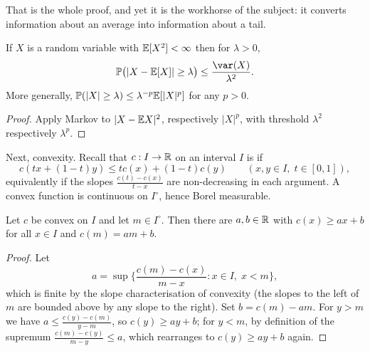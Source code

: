 \documentclass[a4paper]{scrartcl}
\begin{document}
That is the whole proof, and yet it is the workhorse of the subject: it converts information about an average into information about a tail.

\begin{corollary}
	If $X$ is a random variable with $\mathbb{E}[X^2] < \infty$ then for $\lambda>0$,
	$$
	\PP\big( |X - \EE[X]| \geq \lambda\big) \leq \frac{\var(X)}{\lambda^2}.
	$$
	More generally, $\mathbb{P}(|X| \geq \lambda) \leq \lambda^{-p}\mathbb{E}[|X|^p]$ for any $p > 0$.
\end{corollary}
\begin{proof}
	Apply Markov to $|X - \mathbb{E} X|^2$, respectively $|X|^p$, with threshold $\lambda^2$ respectively $\lambda^p$.
\end{proof}

Next, convexity. Recall that $c : I \to \mathbb{R}$ on an interval $I$ is  if
$$
c(tx + (1-t)y) \leq tc(x)+(1-t)c(y) \qquad (x,y \in I,\; t\in[0,1]),
$$
equivalently if the slopes $\frac{c(t)-c(x)}{t-x}$ are non-decreasing in each argument. A convex function is continuous on $I^\circ$, hence Borel measurable.

\begin{lemma}\label{lem:support}
	Let $c$ be convex on $I$ and let $m \in I^\circ$. Then there are $a,b\in\mathbb{R}$ with $c(x) \geq ax+b$ for all $x \in I$ and $c(m)=am+b$.
\end{lemma}
\begin{proof}
	Let
	$$
	a = \sup\Big\{ \frac{c(m)-c(x)}{m-x} : x \in I, \; x<m\Big\},
	$$
	which is finite by the slope characterisation of convexity (the slopes to the left of $m$ are bounded above by any slope to the right). Set $b = c(m)-am$. For $y>m$ we have $a \leq \frac{c(y)-c(m)}{y-m}$, so $c(y)\geq ay+b$; for $y<m$, by definition of the supremum $\frac{c(m)-c(y)}{m-y}\leq a$, which rearranges to $c(y)\geq ay+b$ again.
\end{proof}

\begin{center}
\end{center}
\end{document}
